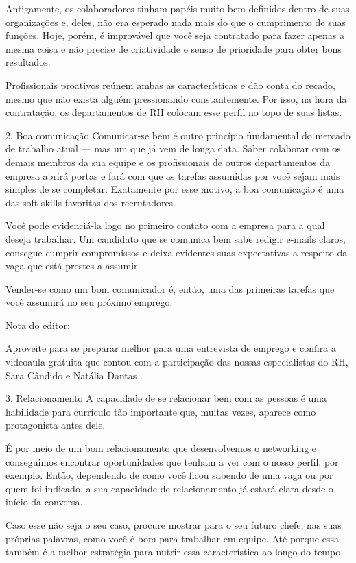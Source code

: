 \begin{commentA}
Antigamente, os colaboradores tinham papéis muito bem definidos dentro de suas organizações e, deles, não era esperado nada mais do que o cumprimento de suas funções. Hoje, porém, é improvável que você seja contratado para fazer apenas a mesma coisa e não precise de criatividade e senso de prioridade para obter bons resultados.

Profissionais proativos reúnem ambas as características e dão conta do recado, mesmo que não exista alguém pressionando constantemente. Por isso, na hora da contratação, os departamentos de RH colocam esse perfil no topo de suas listas.

2. Boa comunicação
Comunicar-se bem é outro princípio fundamental do mercado de trabalho atual — mas um que já vem de longa data. Saber colaborar com os demais membros da sua equipe e os profissionais de outros departamentos da empresa abrirá portas e fará com que as tarefas assumidas por você sejam mais simples de se completar. Exatamente por esse motivo, a boa comunicação é uma das soft skills favoritas dos recrutadores.

Você pode evidenciá-la logo no primeiro contato com a empresa para a qual deseja trabalhar. Um candidato que se comunica bem sabe redigir e-mails claros, consegue cumprir compromissos e deixa evidentes suas expectativas a respeito da vaga que está prestes a assumir.

Vender-se como um bom comunicador é, então, uma das primeiras tarefas que você assumirá no seu próximo emprego.

Nota do editor:

Aproveite para se 
preparar melhor para uma entrevista de emprego
e confira a videoaula gratuita que contou com a participação das nossas especialistas do RH, 
Sara Cândido
e 
Natália Dantas
.

3. Relacionamento
A capacidade de se relacionar bem com as pessoas é uma habilidade para currículo tão importante que, muitas vezes, aparece como protagonista antes dele.

É por meio de um bom relacionamento que desenvolvemos o networking e conseguimos encontrar oportunidades que tenham a ver com o nosso perfil, por exemplo. Então, dependendo de como você ficou sabendo de uma vaga ou por quem foi indicado, a sua capacidade de relacionamento já estará clara desde o início da conversa.

Caso esse não seja o seu caso, procure mostrar para o seu futuro chefe, nas suas próprias palavras, como você é bom para trabalhar em equipe. Até porque essa também é a melhor estratégia para nutrir essa característica ao longo do tempo.


\end{commentA}
